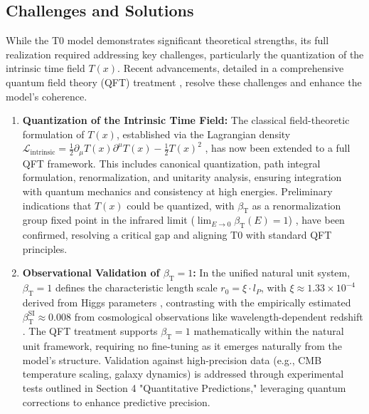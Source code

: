 \documentclass[12pt,a4paper]{article}
\newcommand{\Tfield}{T(x)}
\newcommand{\betaT}{\beta_{\text{T}}}
\newcommand{\calL}{\mathcal{L}}
\begin{document}
		\subsection{Challenges and Solutions}
	\label{subsec:challenges}
	
	While the T0 model demonstrates significant theoretical strengths, its full realization required addressing key challenges, particularly the quantization of the intrinsic time field \(\Tfield\). Recent advancements, detailed in a comprehensive quantum field theory (QFT) treatment \cite{pascher_qft_2025}, resolve these challenges and enhance the model’s coherence.
	
	\begin{enumerate}
		\item \textbf{Quantization of the Intrinsic Time Field:} The classical field-theoretic formulation of \(\Tfield\), established via the Lagrangian density \(\calL_{\text{intrinsic}} = \frac{1}{2}\partial_{\mu}\Tfield\partial^{\mu}\Tfield - \frac{1}{2}\Tfield^2\) \cite{pascher_lagrange_2025}, has now been extended to a full QFT framework. This includes canonical quantization, path integral formulation, renormalization, and unitarity analysis, ensuring integration with quantum mechanics and consistency at high energies. Preliminary indications that \(\Tfield\) could be quantized, with \(\betaT\) as a renormalization group fixed point in the infrared limit (\(\lim_{E \to 0} \betaT(E) = 1\)) \cite{pascher_alphabeta_2025}, have been confirmed, resolving a critical gap and aligning T0 with standard QFT principles.
		
		\item \textbf{Observational Validation of \(\betaT = 1\):} In the unified natural unit system, \(\betaT = 1\) defines the characteristic length scale \(r_0 = \xi \cdot l_P\), with \(\xi \approx 1.33 \times 10^{-4}\) derived from Higgs parameters \cite{pascher_params_2025, pascher_alphabeta_2025}, contrasting with the empirically estimated \(\betaT^{\text{SI}} \approx 0.008\) from cosmological observations like wavelength-dependent redshift \cite{pascher_messdifferenzen_2025}. The QFT treatment supports \(\betaT = 1\) mathematically within the natural unit framework, requiring no fine-tuning as it emerges naturally from the model’s structure. Validation against high-precision data (e.g., CMB temperature scaling, galaxy dynamics) is addressed through experimental tests outlined in Section 4 "Quantitative Predictions," leveraging quantum corrections to enhance predictive precision.
	\end{enumerate}
	
\end{document}
